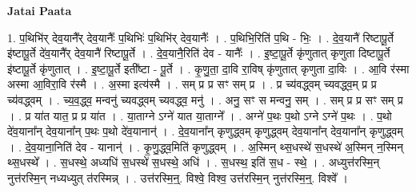 \documentclass[17pt]{extarticle}
\begin{document}
\textbf{Jatai Paata} \newline

1. प॒थिभि॑र् देव॒यानै᳚र् देव॒यानैः᳚ प॒थिभिः॑ प॒थिभि॑र् देव॒यानैः᳚ । . प॒थिभि॒रिति॑ प॒थि - भिः॒ । . दे॒व॒यानै॑ रिष्टापू॒र्ते इ॑ष्टापू॒र्ते दे॑व॒यानै᳚र् देव॒यानै॑ रिष्टापू॒र्ते । . दे॒व॒यानै॒रिति॑ देव - यानैः᳚ । . इ॒ष्टा॒पू॒र्ते कृ॑णुतात् कृणुता दिष्टापू॒र्ते इ॑ष्टापू॒र्ते कृ॑णुतात् । . इ॒ष्टा॒पू॒र्ते इती᳚ष्टा - पू॒र्ते । . कृ॒णु॒ता॒ दा॒वि रा॒विष् कृ॑णुतात् कृणुता दा॒विः । . आ॒वि र॑स्मा अस्मा आ॒विरा॒वि र॑स्मै । . अ॒स्मा इत्य॑स्मै । . सम् प्र प्र सꣳ सम् प्र । . प्र च्य॑वद्ध्वम् च्यवद्ध्व॒म् प्र प्र च्य॑वद्ध्वम् । . च्य॒व॒द्ध्व॒ मन्वनु॑ च्यवद्ध्वम् च्यवद्ध्व॒ मनु॑ । . अनु॒ सꣳ स मन्वनु॒ सम् । . सम् प्र प्र सꣳ सम् प्र । . प्र या॑त यात॒ प्र प्र या॑त । . या॒ताग्ने ऽग्ने॑ यात या॒ताग्ने᳚ । . अग्ने॑ प॒थः प॒थो ऽग्ने ऽग्ने॑ प॒थः । . प॒थो दे॑व॒याना᳚न् देव॒याना᳚न् प॒थः प॒थो दे॑व॒यानान्॑ । . दे॒व॒याना᳚न् कृणुद्ध्वम् कृणुद्ध्वम् देव॒याना᳚न् देव॒याना᳚न् कृणुद्ध्वम् । . दे॒व॒याना॒निति॑ देव - यानान्॑ । . कृ॒णु॒द्ध्व॒मिति॑ कृणुद्ध्वम् । . अ॒स्मिन् थ्स॒धस्थे॑ स॒धस्थे॑ अ॒स्मिन् न॒स्मिन् थ्स॒धस्थे᳚ । . स॒धस्थे॒ अध्यधि॑ स॒धस्थे॑ स॒धस्थे॒ अधि॑ । . स॒धस्थ॒ इति॑ स॒ध - स्थे॒ । . अध्युत्त॑रस्मि॒न् नुत्त॑रस्मि॒न् नध्यध्युत् त॑रस्मिन्न् । . उत्त॑रस्मि॒न्॒. विश्वे॒ विश्व॒ उत्त॑रस्मि॒न् नुत्त॑रस्मि॒न्॒. विश्वे᳚ । \newline
\end{document}
